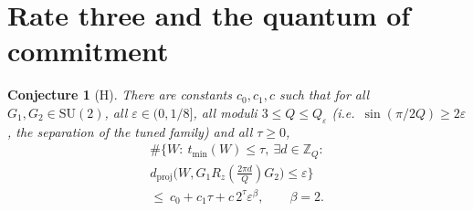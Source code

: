 \documentclass[aps,prx,twocolumn,superscriptaddress,nofootinbib,longbibliography]{revtex4-2}
\theoremstyle{plain}
\newtheorem{conjecture}{Conjecture}
\theoremstyle{definition}
\theoremstyle{remark}
\newcommand{\dproj}{d_{\mathrm{proj}}}
\newcommand{\Z}{\mathbb{Z}}
\newcommand{\SU}{\mathrm{SU}(2)}
\begin{document}
\section{Rate three and the quantum of commitment}\label{sec:conj}

\begin{conjecture}[H]\label{conj:H}
There are constants $c_0,c_1,c$ such that for all $G_1,G_2\in\SU$, all $\varepsilon\in(0,1/8]$, all moduli $3\le Q\le Q_\varepsilon$ (i.e.\ $\sin(\pi/2Q)\ge2\varepsilon$, the separation of the tuned family) and all $\tau\ge0$,
\begin{multline}\label{eq:H}
\#\big\{W:\ t_{\min}(W)\le\tau,\ \exists d\in\Z_Q:\\ \dproj\big(W,G_1R_z(\tfrac{2\pi d}{Q})G_2\big)\le\varepsilon\big\}\\ \le\ c_0+c_1\tau+c\,2^\tau\varepsilon^{\beta},\qquad\beta=2 .
\end{multline}
\end{conjecture}
\end{document}
